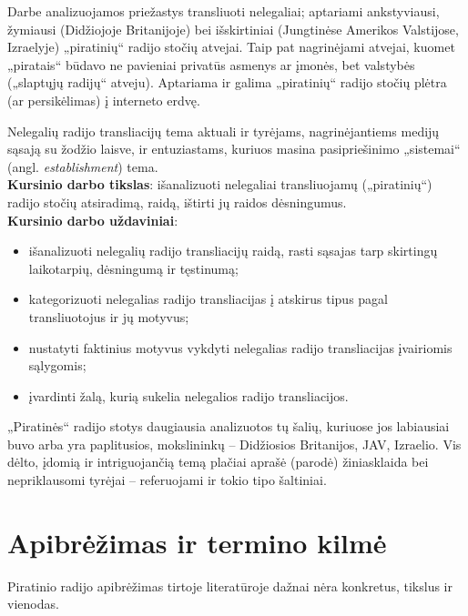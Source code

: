 \documentclass[kursinis-darbas]{vukf}
\begin{document}
Darbe analizuojamos priežastys transliuoti nelegaliai; aptariami ankstyviausi, žymiausi (Didžiojoje Britanijoje) bei išskirtiniai (Jungtinėse Amerikos Valstijose, Izraelyje) „piratinių“ radijo stočių atvejai. Taip pat nagrinėjami atvejai, kuomet „piratais“ būdavo ne pavieniai privatūs asmenys ar įmonės, bet valstybės („slaptųjų radijų“ atveju). Aptariama ir galima „piratinių“ radijo stočių plėtra (ar persikėlimas) į interneto erdvę.

Nelegalių radijo transliacijų tema aktuali ir tyrėjams, nagrinėjantiems medijų sąsają su žodžio laisve, ir entuziastams, kuriuos masina pasipriešinimo „sistemai“ (angl. \emph{establishment}) tema.\\

\textbf{Kursinio darbo tikslas}: išanalizuoti nelegaliai transliuojamų („piratinių“) radijo stočių atsiradimą, raidą, ištirti jų raidos dėsningumus.\\

\textbf{Kursinio darbo uždaviniai}:

\begin{itemize}
	\item išanalizuoti nelegalių radijo transliacijų raidą, rasti sąsajas tarp skirtingų laikotarpių, dėsningumą ir tęstinumą;
	\item kategorizuoti nelegalias radijo transliacijas į atskirus tipus pagal transliuotojus ir jų motyvus;
	\item nustatyti faktinius motyvus vykdyti nelegalias radijo transliacijas įvairiomis sąlygomis;
	\item įvardinti žalą, kurią sukelia nelegalios radijo transliacijos.
\end{itemize}

„Piratinės“ radijo stotys daugiausia analizuotos tų šalių, kuriuose jos labiausiai buvo arba yra paplitusios, mokslininkų – Didžiosios Britanijos, JAV, Izraelio. Vis dėlto, įdomią ir intriguojančią temą plačiai aprašė (parodė) žiniasklaida bei nepriklausomi tyrėjai – referuojami ir tokio tipo šaltiniai.


\section{Apibrėžimas ir termino kilmė}

Piratinio radijo apibrėžimas tirtoje literatūroje dažnai nėra konkretus, tikslus ir vienodas.
\end{document}
